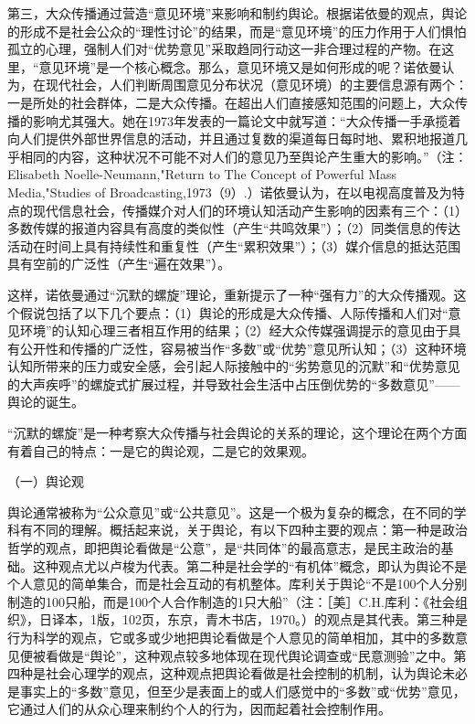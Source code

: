 \documentclass[UTF8,12pt]{ctexart}
\numberwithin{equation}{section} %
\numberwithin{figure}{section}
\numberwithin{table}{section}
\begin{document}
	第三，大众传播通过营造“意见环境”来影响和制约舆论。根据诺依曼的观点，舆论的形成不是社会公众的“理性讨论”的结果，而是“意见环境”的压力作用于人们惧怕孤立的心理，强制人们对“优势意见”采取趋同行动这一非合理过程的产物。在这里，“意见环境”是一个核心概念。那么，意见环境又是如何形成的呢？诺依曼认为，在现代社会，人们判断周围意见分布状况（意见环境）的主要信息源有两个：一是所处的社会群体，二是大众传播。在超出人们直接感知范围的问题上，大众传播的影响尤其强大。她在1973年发表的一篇论文中就写道：“大众传播一手承揽着向人们提供外部世界信息的活动，并且通过复数的渠道每日每时地、累积地报道几乎相同的内容，这种状况不可能不对人们的意见乃至舆论产生重大的影响。”（注：Elisabeth Noelle-Neumann,"Return to The Concept of Powerful Mass Media,"Studies of Broadcasting,1973（9）.）诺依曼认为，在以电视高度普及为特点的现代信息社会，传播媒介对人们的环境认知活动产生影响的因素有三个：（1）多数传媒的报道内容具有高度的类似性（产生“共鸣效果”）；（2）同类信息的传达活动在时间上具有持续性和重复性（产生“累积效果”）；（3）媒介信息的抵达范围具有空前的广泛性（产生“遍在效果”）。
	
	这样，诺依曼通过“沉默的螺旋”理论，重新提示了一种“强有力”的大众传播观。这个假说包括了以下几个要点：（1）舆论的形成是大众传播、人际传播和人们对“意见环境”的认知心理三者相互作用的结果；（2）经大众传媒强调提示的意见由于具有公开性和传播的广泛性，容易被当作“多数”或“优势”意见所认知；（3）这种环境认知所带来的压力或安全感，会引起人际接触中的“劣势意见的沉默”和“优势意见的大声疾呼”的螺旋式扩展过程，并导致社会生活中占压倒优势的“多数意见”——舆论的诞生。
	
	“沉默的螺旋”是一种考察大众传播与社会舆论的关系的理论，这个理论在两个方面有着自己的特点：一是它的舆论观，二是它的效果观。
	
	（一）舆论观
	
	舆论通常被称为“公众意见”或“公共意见”。这是一个极为复杂的概念，在不同的学科有不同的理解。概括起来说，关于舆论，有以下四种主要的观点：第一种是政治哲学的观点，即把舆论看做是“公意”，是“共同体”的最高意志，是民主政治的基础。这种观点尤以卢梭为代表。第二种是社会学的“有机体”概念，即认为舆论不是个人意见的简单集合，而是社会互动的有机整体。库利关于舆论“不是100个人分别制造的100只船，而是100个人合作制造的1只大船”（注：［美］C.H.库利：《社会组织》，日译本，1版，102页，东京，青木书店，1970。）的观点是其代表。第三种是行为科学的观点，它或多或少地把舆论看做是个人意见的简单相加，其中的多数意见便被看做是“舆论”，这种观点较多地体现在现代舆论调查或“民意测验”之中。第四种是社会心理学的观点，这种观点把舆论看做是社会控制的机制，认为舆论未必是事实上的“多数”意见，但至少是表面上的或人们感觉中的“多数”或“优势”意见，它通过人们的从众心理来制约个人的行为，因而起着社会控制作用。
	
\end{document}
